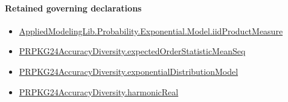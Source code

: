 \documentclass[10pt]{article}
\begin{document}
\paragraph{Retained governing declarations}
\begin{itemize}\raggedright
\item \hyperlink{governing-declaration-58b69b75936abf60}{Applied\allowbreak{}Modeling\allowbreak{}Lib.\allowbreak{}Probability.\allowbreak{}Exponential.\allowbreak{}Model.\allowbreak{}iid\allowbreak{}Product\allowbreak{}Measure}
\item \hyperlink{governing-declaration-9ae5c6cf4ac37116}{PRPKG24\allowbreak{}Accuracy\allowbreak{}Diversity.\allowbreak{}expected\allowbreak{}Order\allowbreak{}Statistic\allowbreak{}Mean\allowbreak{}Seq}
\item \hyperlink{governing-declaration-50b1da7b92c4bb45}{PRPKG24\allowbreak{}Accuracy\allowbreak{}Diversity.\allowbreak{}exponential\allowbreak{}Distribution\allowbreak{}Model}
\item \hyperlink{governing-declaration-54dd9e7bf7a64267}{PRPKG24\allowbreak{}Accuracy\allowbreak{}Diversity.\allowbreak{}harmonic\allowbreak{}Real}
\end{itemize}
\end{document}
